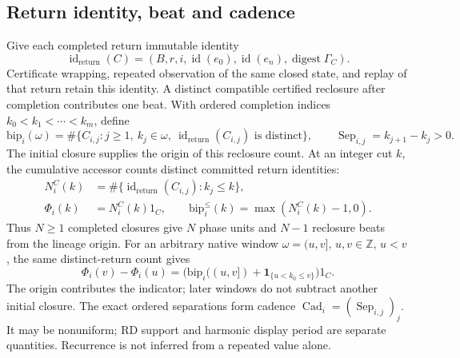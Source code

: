 \subsection{Return identity, beat and cadence}
\label{app:wave:cycle-wave-identity}
Give each completed return immutable identity
\begin{equation}
\operatorname{id}_{\mathrm{return}}(C)=
(B,r,i,\operatorname{id}(e_0),\operatorname{id}(e_n),
\operatorname{digest}\Gamma_C).
\label{eq:return-identity}
\end{equation}
Certificate wrapping, repeated observation of the same closed state, and
replay of that return retain this identity. A distinct compatible certified
reclosure after completion contributes one beat. With ordered completion
indices \(k_0<k_1<\cdots<k_m\), define
\begin{equation}
\mathrm{bip}_i(\omega)=
\#\{C_{i,j}:j\ge1,\ k_j\in\omega,\ \operatorname{id}_{\mathrm{return}}(C_{i,j})
\text{ is distinct}\},\qquad
\operatorname{Sep}_{i,j}=k_{j+1}-k_j>0.
\label{eq:beat-reclosure}
\end{equation}
The initial closure supplies the origin of this reclosure count. At an integer
cut \(k\), the cumulative accessor counts distinct committed return identities:
\begin{equation}
\begin{aligned}
N_i^C(k)&=\#\{\operatorname{id}_{\mathrm{return}}(C_{i,j}):k_j\le k\},\\
\Phi_i(k)&=N_i^C(k)1_C,\qquad
\mathrm{bip}^{\le}_i(k)=\max(N_i^C(k)-1,0).
\end{aligned}
\label{eq:cumulative-closure-counts}
\end{equation}
Thus \(N\ge1\) completed closures give \(N\) phase units and \(N-1\)
reclosure beats from the lineage origin. For an arbitrary native window
\(\omega=(u,v]\), \(u,v\in\mathbb Z\), \(u<v\), the same distinct-return count gives
\begin{equation}
\Phi_i(v)-\Phi_i(u)=
\bigl(\mathrm{bip}_i((u,v])+\mathbf1_{\{u<k_0\le v\}}\bigr)1_C.
\label{eq:closure-phase-window}
\end{equation}
The origin contributes the indicator; later windows do not subtract another
initial closure. The exact ordered separations form cadence \(\operatorname{Cad}_i=(\operatorname{Sep}_{i,j})_j\).
It may be nonuniform; RD support and harmonic display period are separate
quantities. Recurrence is not inferred from a repeated value alone.

